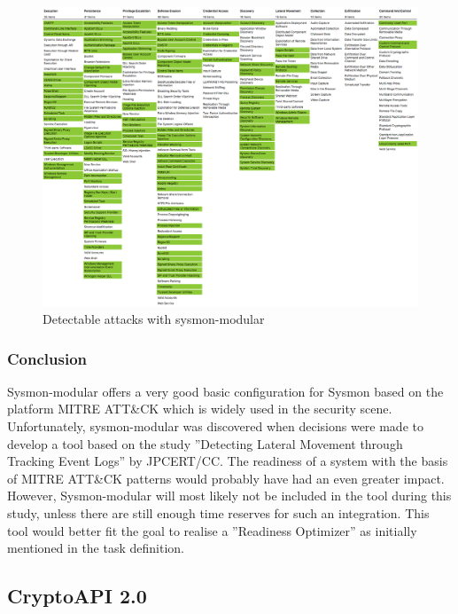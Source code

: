 \begin{figure}[H]
    \centering
    \includegraphics[width=1\linewidth]{assets/sysmon-modular/sysmon-modular.png}
    \caption{Detectable attacks with sysmon-modular}\label{fig:sysmonmodular}
\end{figure}

\subsubsection{Conclusion}
Sysmon-modular offers a very good basic configuration for Sysmon based on the platform MITRE ATT\&CK which is widely used in the security scene. Unfortunately, sysmon-modular was discovered when decisions were made to develop a tool based on the study ''Detecting Lateral Movement through Tracking Event Logs'' by JPCERT/CC. The readiness of a system with the basis of MITRE ATT\&CK patterns would probably have had an even greater impact. However, Sysmon-modular will most likely not be included in the tool during this study, unless there are still enough time reserves for such an integration. This tool would better fit the goal to realise a ''Readiness Optimizer'' as initially mentioned in the task definition.



\subsection{CryptoAPI 2.0} \label{CAPI2}
